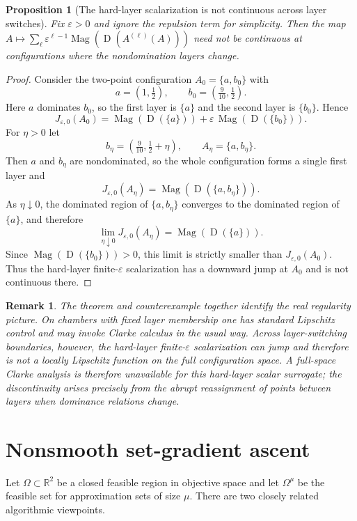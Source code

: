 \documentclass{article}
\newtheorem{proposition}{Proposition}
\newtheorem{remark}{Remark}
\newcommand{\Mag}{\operatorname{Mag}}
\newcommand{\R}{\mathbb{R}}
\newcommand{\front}[1]{A^{(#1)}}
\newcommand{\Dom}{\operatorname{D}}
\begin{document}
\begin{proposition}[The hard-layer scalarization is not continuous across layer switches]
Fix $\varepsilon>0$ and ignore the repulsion term for simplicity. Then the map $A\mapsto \sum_{\ell}\varepsilon^{\ell-1}\Mag(\Dom(\front{\ell}(A)))$ need not be continuous at configurations where the nondomination layers change.
\end{proposition}

\begin{proof}
Consider the two-point configuration $A_0=\{a,b_0\}$ with
\[
a=(1,\tfrac12),
\qquad
b_0=(\tfrac{9}{10},\tfrac12).
\]
Here $a$ dominates $b_0$, so the first layer is $\{a\}$ and the second layer is $\{b_0\}$. Hence
\[
J_{\varepsilon,0}(A_0)=\Mag(\Dom(\{a\})) + \varepsilon\,\Mag(\Dom(\{b_0\})).
\]
For $\eta>0$ let
\[
b_\eta=(\tfrac{9}{10},\tfrac12+\eta),
\qquad
A_\eta=\{a,b_\eta\}.
\]
Then $a$ and $b_\eta$ are nondominated, so the whole configuration forms a single first layer and
\[
J_{\varepsilon,0}(A_\eta)=\Mag(\Dom(\{a,b_\eta\})).
\]
As $\eta\downarrow 0$, the dominated region of $\{a,b_\eta\}$ converges to the dominated region of $\{a\}$, and therefore
\[
\lim_{\eta\downarrow 0} J_{\varepsilon,0}(A_\eta)=\Mag(\Dom(\{a\})).
\]
Since $\Mag(\Dom(\{b_0\}))>0$, this limit is strictly smaller than $J_{\varepsilon,0}(A_0)$. Thus the hard-layer finite-$\varepsilon$ scalarization has a downward jump at $A_0$ and is not continuous there.
\end{proof}

\begin{remark}
The theorem and counterexample together identify the real regularity picture. On chambers with fixed layer membership one has standard Lipschitz control and may invoke Clarke calculus in the usual way. Across layer-switching boundaries, however, the hard-layer finite-$\varepsilon$ scalarization can jump and therefore is not a locally Lipschitz function on the full configuration space. A full-space Clarke analysis is therefore unavailable for this hard-layer scalar surrogate; the discontinuity arises precisely from the abrupt reassignment of points between layers when dominance relations change.
\end{remark}

\section{Nonsmooth set-gradient ascent}
Let $\Omega\subset \R^2$ be a closed feasible region in objective space and let $\Omega^\mu$ be the feasible set for approximation sets of size $\mu$. There are two closely related algorithmic viewpoints.
\end{document}
